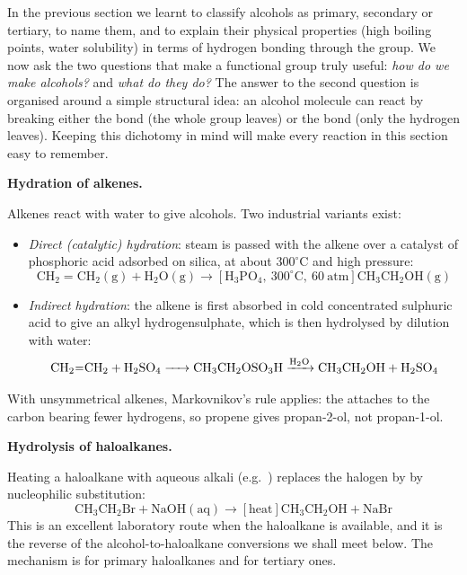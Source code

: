 \documentclass[11pt]{article}
\newcommand{\cle}[1]{{\popxbold\color{popdark}#1}}
\newcounter{popsec}
\newcounter{popsub}
\newcommand{\courssub}[1]{%
  \stepcounter{popsub}%
  \par\vspace{9pt}\noindent{\popxbold\fontsize{11.5}{13}\selectfont\color{popink}{\color{poporange}\thepopsec.\thepopsub}\hspace{6pt}#1}\par\nopagebreak\vspace{4pt}
}
\begin{document}
In the previous section we learnt to classify alcohols as primary, secondary or tertiary, to name them, and to explain their physical properties (high boiling points, water solubility) in terms of hydrogen bonding through the  group. We now ask the two questions that make a functional group truly useful: \emph{how do we make alcohols?} and \emph{what do they do?} The answer to the second question is organised around a simple structural idea: an alcohol molecule  can react by breaking either the \cle{ bond} (the whole  group leaves) or the \cle{ bond} (only the hydrogen leaves). Keeping this dichotomy in mind will make every reaction in this section easy to remember.

\courssub{Preparation of Alcohols}

\textbf{Hydration of alkenes.}\par
Alkenes react with water to give alcohols. Two industrial variants exist:

\begin{itemize}
\item \emph{Direct (catalytic) hydration}: steam is passed with the alkene over a catalyst of phosphoric acid adsorbed on silica, at about $300^\circ\mathrm{C}$ and high pressure:
\[\ensuremath{\mathrm{CH_{2}=CH_{2}(g) + H_{2}O(g) \rightarrow [H_{3}PO_{4},\ 300^\circ\mathrm{C},\ 60\ atm] CH_{3}CH_{2}OH(g)}}\]
\item \emph{Indirect hydration}: the alkene is first absorbed in cold concentrated sulphuric acid to give an alkyl hydrogensulphate, which is then hydrolysed by dilution with water:
\[\ce{CH2=CH2 + H2SO4 -> CH3CH2OSO3H ->[H2O] CH3CH2OH + H2SO4}\]
\end{itemize}

With unsymmetrical alkenes, Markovnikov's rule applies: the  attaches to the carbon bearing fewer hydrogens, so propene gives propan-2-ol, not propan-1-ol.

\textbf{Hydrolysis of haloalkanes.}\par
Heating a haloalkane with aqueous alkali (e.g.\ ) replaces the halogen by  by nucleophilic substitution:
\[\ensuremath{\mathrm{CH_{3}CH_{2}Br + NaOH(aq) \rightarrow [\text{heat}] CH_{3}CH_{2}OH + NaBr}}\]
This is an excellent laboratory route when the haloalkane is available, and it is the reverse of the alcohol-to-haloalkane conversions we shall meet below. The mechanism is  for primary haloalkanes and  for tertiary ones.
\end{document}
